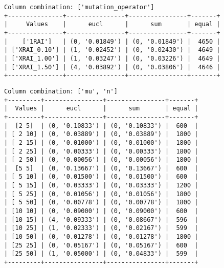 \documentclass{article}
\begin{document}
\begin{verbatim}
Column combination: ['mutation_operator']
+---------------+----------------+----------------+-------+
|     Values    |      eucl      |      sum       | equal |
+---------------+----------------+----------------+-------+
|    ['1RAI']   | (0, '0.01849') | (0, '0.01849') |  4650 |
| ['XRAI_0.10'] | (1, '0.02452') | (0, '0.02430') |  4649 |
| ['XRAI_1.00'] | (1, '0.03247') | (0, '0.03226') |  4649 |
| ['XRAI_1.50'] | (4, '0.03892') | (0, '0.03806') |  4646 |
+---------------+----------------+----------------+-------+
\end{verbatim}

\begin{verbatim}
Column combination: ['mu', 'n']
+---------+----------------+----------------+-------+
|  Values |      eucl      |      sum       | equal |
+---------+----------------+----------------+-------+
|  [2 5]  | (0, '0.10833') | (0, '0.10833') |  600  |
| [ 2 10] | (0, '0.03889') | (0, '0.03889') |  1800 |
| [ 2 15] | (0, '0.01000') | (0, '0.01000') |  1800 |
| [ 2 25] | (0, '0.00333') | (0, '0.00333') |  1800 |
| [ 2 50] | (0, '0.00056') | (0, '0.00056') |  1800 |
|  [5 5]  | (0, '0.13667') | (0, '0.13667') |  600  |
| [ 5 10] | (0, '0.01500') | (0, '0.01500') |  600  |
| [ 5 15] | (0, '0.03333') | (0, '0.03333') |  1200 |
| [ 5 25] | (0, '0.01056') | (0, '0.01056') |  1800 |
| [ 5 50] | (0, '0.00778') | (0, '0.00778') |  1800 |
| [10 10] | (0, '0.09000') | (0, '0.09000') |  600  |
| [10 15] | (4, '0.09333') | (0, '0.08667') |  596  |
| [10 25] | (1, '0.02333') | (0, '0.02167') |  599  |
| [10 50] | (0, '0.01278') | (0, '0.01278') |  1800 |
| [25 25] | (0, '0.05167') | (0, '0.05167') |  600  |
| [25 50] | (1, '0.05000') | (0, '0.04833') |  599  |
+---------+----------------+----------------+-------+
\end{verbatim}
\end{document}
